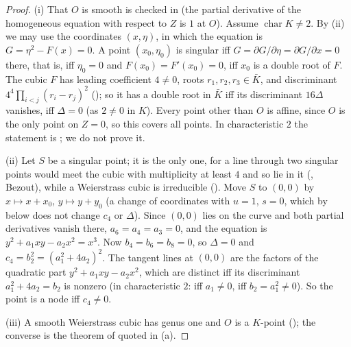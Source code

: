\begin{proof}
(i) That $O$ is smooth is checked in  (the partial derivative of the homogeneous equation with respect to $Z$ is $1$ at $O$).
Assume $\operatorname{char}K\ne2$. By (ii) we may use the coordinates $(x,\eta)$, in which the equation is
$G=\eta^2-F(x)=0$. A point $(x_0,\eta_0)$ is singular iff $G=\partial G/\partial\eta=\partial G/\partial x=0$ there, that is, iff $\eta_0=0$ and
$F(x_0)=F'(x_0)=0$, iff $x_0$ is a double root of $F$. The cubic $F$ has leading coefficient $4\ne0$, roots $r_1,r_2,r_3\in\bar K$, and discriminant
$4^4\prod_{i<j}(r_i-r_j)^2$ (); so it has a double root in $\bar K$ iff its discriminant $16\Delta$ vanishes, iff $\Delta=0$ (as $2\ne0$ in $K$). Every point
other than $O$ is affine, since $O$ is the only point on $Z=0$, so this covers all points. In
characteristic $2$ the statement is \cite[Section III.1]{SilvermanAEC}; we do not prove it.

(ii) Let $S$ be a singular point; it is the only one, for a line through two singular points would meet the cubic with multiplicity at least
$4$ and so lie in it (, Bezout), while a Weierstrass cubic is irreducible (). Move $S$ to $(0,0)$ by
$x\mapsto x+x_0$, $y\mapsto y+y_0$ (a change of coordinates with $u=1$, $s=0$, which by  below does not
change $c_4$ or $\Delta$). Since $(0,0)$ lies on the curve and both partial derivatives vanish there, $a_6=a_4=a_3=0$, and the equation is
$y^2+a_1xy-a_2x^2=x^3$. Now $b_4=b_6=b_8=0$, so $\Delta=0$ and $c_4=b_2^2=(a_1^2+4a_2)^2$. The tangent lines at $(0,0)$ are the factors of the
quadratic part $y^2+a_1xy-a_2x^2$, which are distinct iff its discriminant $a_1^2+4a_2=b_2$ is nonzero (in characteristic $2$: iff $a_1\ne0$,
iff $b_2=a_1^2\ne0$). So the point is a node iff $c_4\ne0$.

(iii) A smooth Weierstrass cubic has genus one and $O$ is a $K$-point (); the converse is the theorem of 
quoted in (a).
\end{proof}

